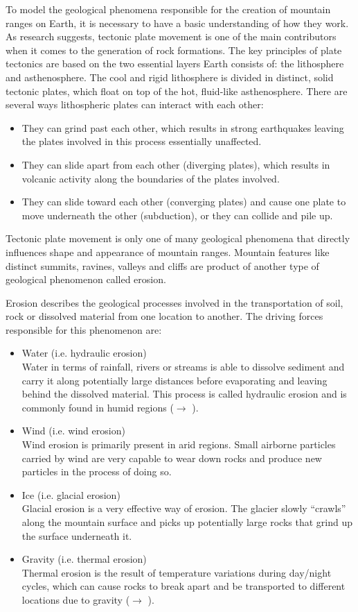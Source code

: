 \documentclass[11pt,a4paper,twoside,openright]{report}
\begin{document}
To model the geological phenomena responsible for the creation of mountain ranges on Earth, it is necessary to have a basic understanding of how they work. As research suggests, tectonic plate movement is one of the main contributors when it comes to the generation of rock formations. The key principles of plate tectonics are based on the two essential layers Earth consists of: the lithosphere and asthenosphere. The cool and rigid lithosphere is divided in distinct, solid tectonic plates, which float on top of the hot, fluid-like asthenosphere. There are several ways lithospheric plates can interact with each other:
\begin{itemize}
  \item They can grind past each other, which results in strong earthquakes leaving the plates involved in this process essentially unaffected.
  \item They can slide apart from each other (diverging plates), which results in volcanic activity along the boundaries of the plates involved.
  \item They can slide toward each other (converging plates) and cause one plate to move underneath the other (subduction), or they can collide and pile up.
\end{itemize}
Tectonic plate movement is only one of many geological phenomena that directly influences shape and appearance of mountain ranges. Mountain features like distinct summits, ravines, valleys and cliffs are product of another type of geological phenomenon called erosion.

Erosion describes the geological processes involved in the transportation of soil, rock or dissolved material from one location to another. The driving forces responsible for this phenomenon are:
\begin{itemize}
  \item Water (i.e. hydraulic erosion)
  \\
  Water in terms of rainfall, rivers or streams is able to dissolve sediment and carry it along potentially large distances before evaporating and leaving behind the dissolved material. This process is called hydraulic erosion and is commonly found in humid regions ($\rightarrow$ ).
  \item Wind (i.e. wind erosion)
  \\
  Wind erosion is primarily present in arid regions. Small airborne particles carried by wind are very capable to wear down rocks and produce new particles in the process of doing so.
  \item Ice (i.e. glacial erosion)
  \\
  Glacial erosion is a very effective way of erosion. The glacier slowly ``crawls'' along the mountain surface and picks up potentially large rocks that grind up the surface underneath it.
  \item Gravity (i.e. thermal erosion)
  \\
  Thermal erosion is the result of temperature variations during day/night cycles, which can cause rocks to break apart and be transported to different locations due to gravity ($\rightarrow$ ).
\end{itemize}
\end{document}
